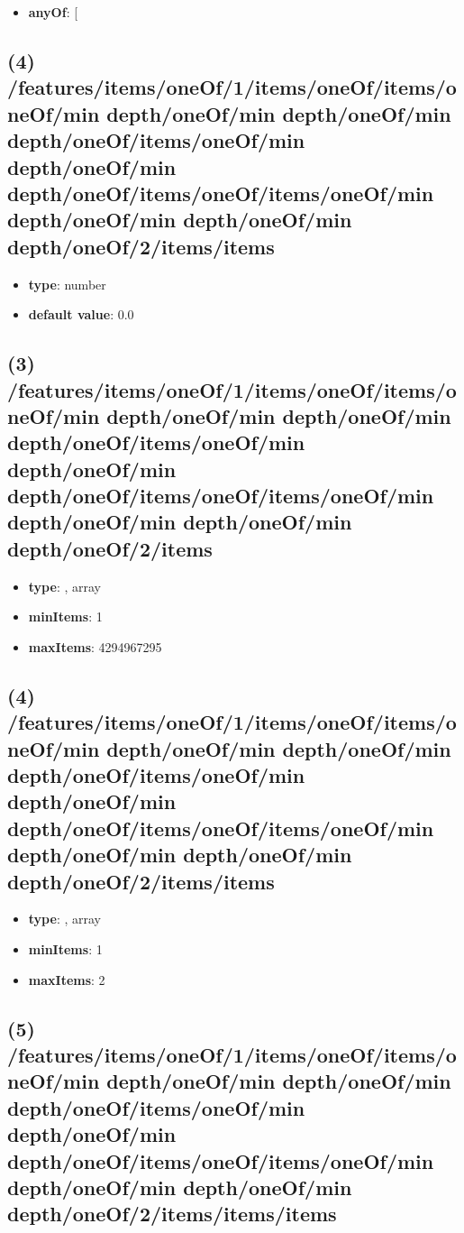 \begin{itemize}[leftmargin=4em]\item {\bf anyOf}: [\end{itemize}\subsection{(4) /features/items/oneOf/1/items/oneOf/items/oneOf/min depth/oneOf/min depth/oneOf/min depth/oneOf/items/oneOf/min depth/oneOf/min depth/oneOf/items/oneOf/items/oneOf/min depth/oneOf/min depth/oneOf/min depth/oneOf/2/items/items}
\begin{itemize}[leftmargin=4em]\item {\bf type}: number\item {\bf default value}: 0.0
\end{itemize}\subsection{(3) /features/items/oneOf/1/items/oneOf/items/oneOf/min depth/oneOf/min depth/oneOf/min depth/oneOf/items/oneOf/min depth/oneOf/min depth/oneOf/items/oneOf/items/oneOf/min depth/oneOf/min depth/oneOf/min depth/oneOf/2/items}
\begin{itemize}[leftmargin=3em]\item {\bf type}: , array\item {\bf minItems}: 1
\item {\bf maxItems}: 4294967295
\end{itemize}\subsection{(4) /features/items/oneOf/1/items/oneOf/items/oneOf/min depth/oneOf/min depth/oneOf/min depth/oneOf/items/oneOf/min depth/oneOf/min depth/oneOf/items/oneOf/items/oneOf/min depth/oneOf/min depth/oneOf/min depth/oneOf/2/items/items}
\begin{itemize}[leftmargin=4em]\item {\bf type}: , array\item {\bf minItems}: 1
\item {\bf maxItems}: 2
\end{itemize}\subsection{(5) /features/items/oneOf/1/items/oneOf/items/oneOf/min depth/oneOf/min depth/oneOf/min depth/oneOf/items/oneOf/min depth/oneOf/min depth/oneOf/items/oneOf/items/oneOf/min depth/oneOf/min depth/oneOf/min depth/oneOf/2/items/items/items}
